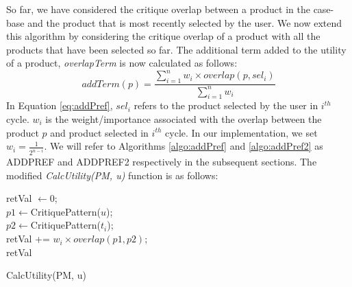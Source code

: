 So far, we have considered the critique overlap between a product in the case-base and the product that is most recently selected by the user.
We now extend this algorithm by considering the critique overlap of a product with all the products that have been selected so far.
The additional term added to the utility of a product, \textit{overlapTerm} is now calculated as follows:
\begin{equation}
\label{eq:addPref}
addTerm(p) = \frac{\sum_{i=1}^{n} {w_i \times overlap(p,sel_i)}} {\sum_{i=1}^{n}w_i}
\end{equation}
In Equation \ref{eq:addPref}, $sel_i$ refers to the product selected by the user in $i^{th}$ cycle.
$w_i$ is the weight/importance associated with the overlap between the product $p$ and product selected in $i^{th}$ cycle.
In our implementation, we set $w_i = \frac{1}{2^{n-i}}$.
We will refer to Algorithms \ref{algo:addPref} and \ref{algo:addPref2} as ADDPREF and ADDPREF2 respectively in the subsequent sections.
The modified \textit{CalcUtility(PM, u)} function is as follows:

\begin{algorithm}[ht]
  \DontPrintSemicolon

  retVal $\gets 0$;\\
   {
      $p1 \gets $CritiquePattern($u$);\\
      $p2 \gets $CritiquePattern($t_i$);\\
      retVal += $w_i \times overlap(p1, p2)$;\\
  }
  \Return retVal
  \caption{CalcUtility(PM, u)}
  \label{algo:addPref2}
\end{algorithm}

